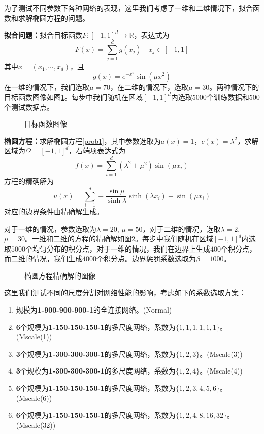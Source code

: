 为了测试不同参数下各种网络的表现，这里我们考虑了一维和二维情况下，拟合函数和求解椭圆方程的问题。

\textbf{拟合问题：}拟合目标函数$F: [-1, 1]^d \rightarrow \mathbb{R}$，表达式为
\begin{equation}
F(x) = \sum_{j=1}^{d} g(x_{j})  \quad x_{j} \in [-1, 1]
\end{equation}
其中$x=(x_1,\cdots,x_d)$，且
$$ g(x) = e^{-x^2} \sin(\mu x^2) $$
在一维的情况下，我们选取$\mu=70$，在二维的情况下，选取$\mu=30$。两种情况下的目标函数图像如图\ref{func1}。每步中我们随机在区域$[-1, 1]^d$内选取$5000$个训练数据和$500$个测试数据点。

\begin{figure}[htbp]
\centering
{}
\caption{目标函数图像}
\label{func1}
\end{figure}

\textbf{椭圆方程：}求解椭圆方程\ref{prob1}，其中参数选取为$a(x)=1$，$c(x)=\lambda^2$，求解区域为$\Omega = [-1, 1]^d$，右端项表达式为
$$ f(x) = \sum_{i=1}^{d} (\lambda^2 + \mu^2) \sin(\mu x_i) $$
方程的精确解为
$$ u(x) = \sum_{i=1}^{d} - \frac{\sin \mu}{\sinh \lambda} \sinh(\lambda x_i) + \sin(\mu x_i) $$
对应的边界条件由精确解生成。

对于一维的情况，参数选取为$\lambda=20$, $\mu=50$，对于二维的情况，选取$\lambda=2$, $\mu=30$。一维和二维的方程的精确解如图\ref{func2}。每步中我们随机在区域$[-1, 1]^d$内选取$5000$个均匀分布的积分点，对于一维的情况，我们在边界上生成$400$个积分点，而二维的情况，我们生成$4000$个积分点。边界惩罚系数选取为$\beta=1000$。

\begin{figure}[htbp]
\centering
{}
\caption{椭圆方程精确解的图像}
\label{func2}
\end{figure}


这里我们测试不同的尺度分割对网络性能的影响，考虑如下的系数选取方案：
\begin{enumerate}
\item 规模为\textbf{1-900-900-900-1}的全连接网络。(Normal)
\item \textbf{6}个规模为\textbf{1-150-150-150-1}的多尺度网络，系数为$\{1,1,1,1,1,1\}$。(Mscale(1))
\item \textbf{3}个规模为\textbf{1-300-300-300-1}的多尺度网络，系数为$\{1,2,3\}$。(Mscale(3))
\item \textbf{3}个规模为\textbf{1-300-300-300-1}的多尺度网络，系数为$\{1,2,4\}$。(Mscale(4))
\item \textbf{6}个规模为\textbf{1-150-150-150-1}的多尺度网络，系数为$\{1,2,3,4,5,6\}$。(Mscale(6))
\item \textbf{6}个规模为\textbf{1-150-150-150-1}的多尺度网络，系数为$\{1,2,4,8,16,32\}$。(Mscale(32))
\end{enumerate}

